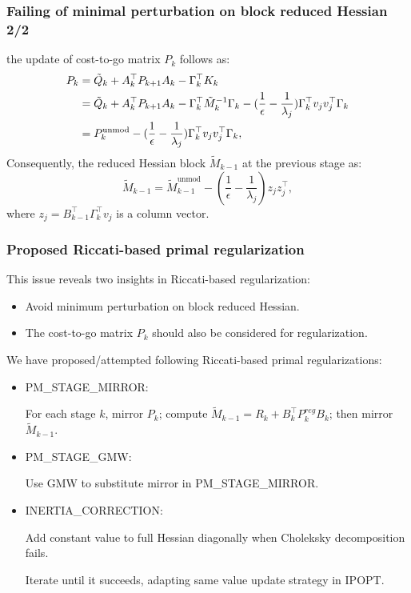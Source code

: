 \documentclass[10pt,aspectratio=1610]{beamer} %
\begin{document}
\begin{frame}
    \frametitle{Failing of minimal perturbation on block reduced Hessian 2/2}
    the update of cost-to-go matrix $P_k$ follows as:
    \begin{align}
        P_k &= \tilde{Q}_k + A_k^\top P_{k+1} A_k - \Gamma_k^\top K_k \notag \\
            &=\tilde{Q}_k + A_k^\top P_{k+1} A_k - \Gamma_k^\top \tilde{M}_k^{-1} \Gamma_k - (\frac{1}{\epsilon} - \frac{1}{\lambda_j}) \Gamma_k^\top v_j v_j^\top \Gamma_k \notag \\
            &= P_k^{\mathrm{unmod}} - (\frac{1}{\epsilon} - \frac{1}{\lambda_j}) \Gamma_k^\top v_j v_j^\top \Gamma_k,
    \end{align}
    Consequently, the reduced Hessian block $\tilde{M}_{k-1}$ at the previous stage as:
    \begin{equation}
        \tilde{M}_{k-1} = \tilde{M}_{k-1}^{\mathrm{unmod}} - (\frac{1}{\epsilon} - \frac{1}{\lambda_j}) z_j z_j^\top,
    \end{equation}
    where $z_j = B_{k-1}^\top \Gamma_k^\top v_j$ is a column vector.
\end{frame}

\begin{frame}
    \frametitle{Proposed Riccati-based primal regularization}
    This issue reveals two insights in Riccati-based regularization:
    \begin{itemize}
        \item Avoid minimum perturbation on block reduced Hessian.
        \item The cost-to-go matrix $P_k$ should also be considered for regularization.
    \end{itemize}

    \vspace{0.5cm}

    We have proposed/attempted following Riccati-based primal regularizations:
    \begin{itemize}
        \item PM\_STAGE\_MIRROR: 

        For each stage $k$, 
        mirror $P_k$;
        compute $\tilde{M}_{k-1} = R_k + B^\top_k P_k^{reg}B_k$; 
        then mirror $\tilde{M}_{k-1}$.
        \item PM\_STAGE\_GMW: 

        Use GMW to substitute mirror in PM\_STAGE\_MIRROR.
        \item INERTIA\_CORRECTION: \

        Add constant value to full Hessian diagonally when Choleksky decomposition fails.

        Iterate until it succeeds, adapting same value update strategy in IPOPT.

    \end{itemize}

\end{frame}
\end{document}
